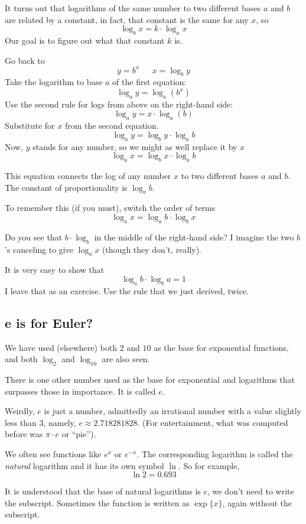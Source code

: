 \documentclass[11pt, oneside]{article}
\begin{document}
It turns out that logarithms of the same number to two different bases $a$ and $b$ are related by a constant, in fact, that constant is the same for any $x$, so
\[ \log_b x = k \cdot \log_a x \]
Our goal is to figure out what that constant $k$ is.

Go back to
\[ y = b^x \ \ \ \ \ \ \ x = \log_b y \]
Take the logarithm to base $a$ of the first equation:
\[ \log_a y = \log_a (b^x) \]
Use the second rule for logs from above on the right-hand side:
\[  \log_a y = x \cdot \log_a (b) \]
Substitute for $x$ from the second equation.
\[ \log_a y = \log_b y \cdot \log_a b \]
Now, $y$ stands for any number, so we might as well replace it by $x$
\[ \log_a x = \log_b x \cdot \log_a b \]

This equation connects the log of any number $x$ to two different bases $a$ and $b$.  The constant of proportionality is $\log_a b$.  

To remember this (if you must), switch the order of terms
\[ \log_a x = \log_a b \cdot \log_b x  \]

Do you see that $b \cdot \log_b$ in the middle of the right-hand side?  I imagine the two $b$'s canceling to give $\log_a x$ (though they don't, really).

It is very easy to show that
\[ \log_a b \cdot \log_b a = 1 \]
I leave that as an exercise.  Use the rule that we just derived, twice.

\subsection*{e is for Euler?}

We have used (elsewhere) both $2$ and $10$ as the base for exponential functions, and both $\log_2$ and $\log_{10}$ are also seen.  

There is one other number used as the base for exponential and logarithms that surpasses those in importance.  It is called $e$.  

Weirdly, $e$ is just a number, admittedly an irrational number with a value slightly less than $3$, namely, $e \approx 2.718281828$.  (For entertainment, what was computed before was $\pi \cdot e$ or ``pie'').

We often see functions like $e^x$ or $e^{-x}$.  The corresponding logarithm is called the \emph{natural} logarithm and it has its own symbol $\ln$.  So for example,
\[ \ln 2 = 0.693 \]

It is understood that the base of natural logarithms is $e$, we don't need to write the subscript.  Sometimes the function is written as $\exp \{ x \}$, again without the subscript.
\end{document}
